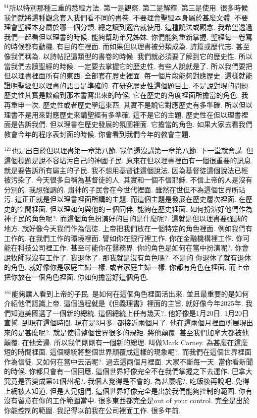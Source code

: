 \documentclass{book}
\begin{document}
$^{81}$所以特別那種三重的悉經方法.
第一是觀察.
第二是解釋.
第三是使用.
很多時候我們就將這種觀念套入我們看不同的書卷.
不要理會聖經本身屬於甚麼文體.
不要理會聖經本身屬於哪一個分類.
總之讀到適合就使用.
這種說法或觀念.
我希望透過我們一起看但以理書的時候.
能夠幫助弟兄姊妹.
你們能夠重新掌握.
聖經每一卷寫的時候都有動機.
有目的在裡面.
而如果但以理書被分類成為.
詩篇或歷代志.
甚至像我們稱為.
以詩帖記這類型的書卷的時候.
我們就必須要了解到它的歷史性.
所以當我們去讀聖經的時候.
一定要去掌握它的歷史性.
有些人說就是了.
所以我們要把但以理書裡面所有的東西.
全部套在歷史裡面.
每一個片段能夠對應歷史.
這樣就能證明聖經但以理書的語言是準確的.
在研究歷史性這個題目上.
不是說對現的問題.
歷史性其實是談論到那本書寫出來的時候.
它在歷史的角度裡面所擔當的角色.
我再重申一次.
歷史性或者歷史學這東西.
其實不是說它對應歷史有多準確.
所以但以理書不是用來對應歷史來講聖經有多準確.
這不是它的主題.
歷史性在但以理書裡面是告訴我們.
但以理書在歷史發展的氛圍裡面.
它擔當的角色.
如果大家去看我們教會今年的程序表封面的時候.
你會看到我們今年的教會主題.

$^{121}$也是出自於但以理書第一章第八節.
我們還沒講第一章第八節.
下一堂就會講.
但這個標題是說不容玷污自己的神國子民.
原來在但以理書裡面有一個很重要的訊息.
就是要告訴所有屬主的子民.
我不想用基督徒這個說法.
因為基督徒這個說法已經被污染了.
今天很多自稱為基督徒的人.
其實和一個不信耶穌.
不信上帝的人是沒有分別的.
我想強調的.
肅神的子民會在今世代裡面.
雖然在世但不為這個世界所玷污.
這正正就是但以理書裡面所講的主題.
而這個主題是發展在歷史層次裡面.
在歷史的空間裡面.
但以理如何與他的三個同伴.
能夠在歷史裡面.
如何扮演好他們作為神子民的角色呢?.
而這個角色扮演好的目的是什麼呢?.
這就是但以理書要強調的地方.
就好像今天我們作為信徒.
上帝把我們放在一個特定的角色裡面.
例如我們有工作的.
在我們工作的環境裡面.
譬如你在銀行裡工作.
你在金融機構裡工作.
你可能在科技公司裡工作.
甚至可能你在醫務界.
你的角色是如何在當中扮演呢?.
你會說牧師我沒有工作了.
我退休了.
那我就是沒有角色嗎?.
不是的 你退休了就有退休的角色.
就好像你是家庭主婦一樣.
或者家庭主婦一樣.
你都有角色在裡面.
而上帝把你放在一個角色裡面.
你如何擔當好這個角色.

$^{161}$能夠讓人看到上帝的子民.
是如何在這個角色裡面活出來.
並且最重要的是如何介紹他們認識上帝.
這個過程就是《但義理書》裡面的主旨.
就好像今年2025年.
我們知道美國選了一個新的總統.
這個總統上任有幾天?.
他好像是1月20日.
1月20日宣誓.
到現在這個時間.
現在是3月多.
都接近兩個月了.
他在這兩個月裡面所展現出來的是甚麼呢?.
就是使得整個世界很多的規矩.
將他顛覆.
甚至我們加拿大都被他顛覆.
在他旁邊.
所以我們剛剛有一個新的總理.
叫做Mark Carney.
為甚麼在這麼短的時間裡面.
這個總統將整個世界顛覆成這樣的現象呢?.
而我們在這個世界裡面作為信徒.
又如何在當中去活呢?.
過去這兩個月裡面.
大家不斷每一天.
當你看新聞的時候.
你都只會有一個回應.
這個世界好像完全不在我們掌握之下去運作.
巴拿大究竟是否變成第51個州呢?.
我個人覺得是不會的.
為甚麼呢?.
吃飯後再說吧.
免得上網被人知道.
但是大兄姐們.
這個世界好像完全是出於我們能夠控制的範圍.
你有沒有留意在你的工作範圍當中.
很多東西都完全是out of your control.
完全是出於你能控制的範圍.
我記得以前我在公司裡面工作.
很多年前.
\end{document}
